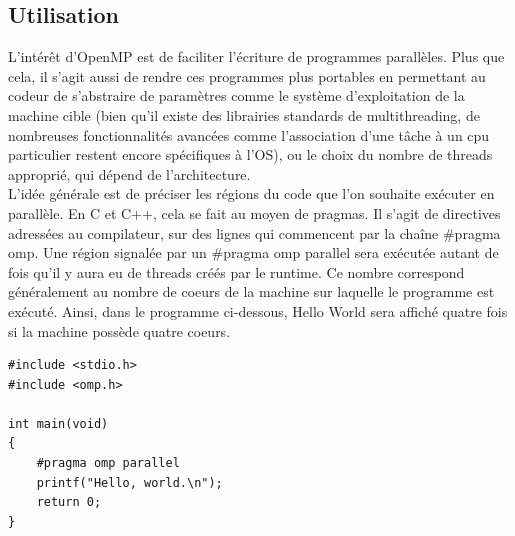 \documentclass{report}
\begin{document}
\subsection{Utilisation}

L'intérêt d'OpenMP est de faciliter l'écriture de programmes parallèles. Plus que cela, il s'agit aussi 
de rendre ces programmes plus portables en permettant au codeur de s'abstraire de paramètres comme le 
système d'exploitation de la machine cible (bien qu'il existe des librairies standards de multithreading, 
de nombreuses fonctionnalités avancées comme l'association d'une tâche à un cpu particulier restent encore
spécifiques à l'OS), ou le choix du nombre de threads approprié, qui dépend de l'architecture.
\\L'idée générale est de préciser les régions du code que l'on souhaite exécuter en parallèle. En C et 
C++, cela se fait au moyen de pragmas. Il s'agit de directives adressées au compilateur, sur des lignes qui 
commencent par la chaîne \#pragma omp. Une région signalée par un \#pragma omp parallel sera 
exécutée autant de fois qu'il y aura eu de threads créés par le runtime. Ce nombre correspond généralement 
au nombre de coeurs de la machine sur laquelle le programme est exécuté. Ainsi, dans le programme 
ci-dessous, Hello World sera affiché quatre fois si la machine possède quatre coeurs.
\begin{lstlisting}
#include <stdio.h>
#include <omp.h>

int main(void)
{
    #pragma omp parallel
    printf("Hello, world.\n");
    return 0;
}


\end{lstlisting}
\end{document}
